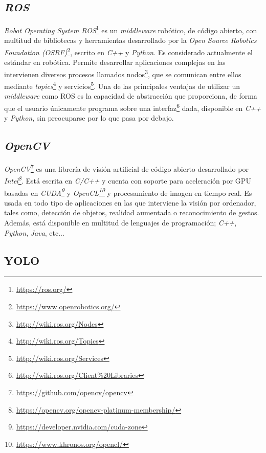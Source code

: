 \subsection{\textit{ROS}}
\label{subsection:ros}
\textit{Robot Operating System ROS}\footnote{\url{https://ros.org/}} es un \textit{middleware} robótico, de código abierto, con multitud de bibliotecas y herramientas desarrollado por la \textit{Open Source Robotics Foundation (OSRF)}\footnote{\url{https://www.openrobotics.org/}}, escrito en \textit{C++} y \textit{Python}. Es considerado actualmente el estándar en robótica. Permite desarrollar aplicaciones complejas en las intervienen diversos procesos llamados nodos\footnote{\url{http://wiki.ros.org/Nodes}}, que se comunican entre ellos mediante \textit{topics}\footnote{\url{http://wiki.ros.org/Topics}} y servicios\footnote{\url{http://wiki.ros.org/Services}}. Una de las principales ventajas de utilizar un \textit{middleware} como ROS es la capacidad de abstracción que proporciona, de forma que el usuario únicamente programa sobre una interfaz\footnote{\url{http://wiki.ros.org/Client\%20Libraries}} dada, disponible en \textit{C++} y \textit{Python}, sin preocuparse por lo que pasa por debajo.\\

\subsection{\textit{OpenCV}}
\label{subsection:opencv}
\textit{OpenCV}\footnote{\url{https://github.com/opencv/opencv}} es una librería de visión artificial de código abierto desarrollado por \textit{Intel\footnote{\url{https://opencv.org/opencv-platinum-membership/}}}. Está escrita en \textit{C/C++} y cuenta con soporte para aceleración por GPU basadas en \textit{CUDA\footnote{\url{https://developer.nvidia.com/cuda-zone}}} y \textit{OpenCL\footnote{\url{https://www.khronos.org/opencl/}}} y procesamiento de imagen en tiempo real. Es usada en todo tipo de aplicaciones en las que interviene la visión por ordenador, tales como, detección de objetos, realidad aumentada o reconocimiento de gestos. Además, está disponible en multitud de lenguajes de programación; \textit{C++}, \textit{Python}, \textit{Java}, etc...\\

\subsection{YOLO}
\label{sec:yolo}

